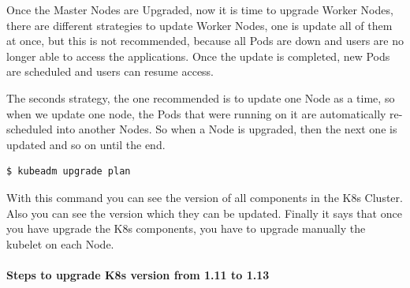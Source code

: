\documentclass{article}
\newenvironment{codetemplate}[1][]{%
  \mybasecolorbox[#1]
  \itshape
}{%
  \endmybasecolorbox
}
\begin{document}
Once the Master Nodes are Upgraded, now it is time to upgrade Worker Nodes, there are different strategies to update Worker Nodes, one is update all of them at once, but this is not recommended, because all Pods are down and users are no longer able to access the applications. Once the update is completed, new Pods are scheduled and users can resume access.

The seconds strategy, the one recommended is to update one Node as a time, so when we update one node, the Pods that were running on it are automatically re-scheduled into another Nodes. So when a Node is upgraded, then the next one is updated and so on until the end.

\begin{codetemplate}{}
\begin{verbatim}
$ kubeadm upgrade plan
\end{verbatim}
\end{codetemplate}

With this command you can see the version of all components in the K8s Cluster. Also you can see the version which they can be updated. Finally it says that once you have upgrade the K8s components, you have to upgrade manually the kubelet on each Node.

\paragraph{Steps to upgrade K8s version from 1.11 to 1.13}
\end{document}
